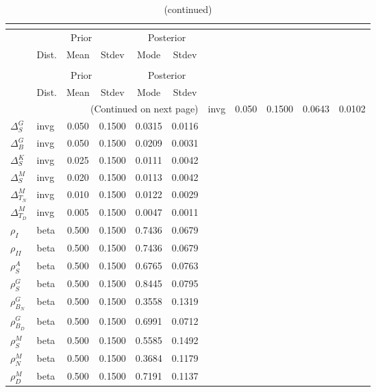  
\begin{center}
\begin{longtable}{llcccc} 
\caption{Results from posterior maximization (parameters)}\\
 \label{Table:Posterior:1}\\
\toprule 
  & \multicolumn{3}{c}{Prior}  &  \multicolumn{2}{c}{Posterior} \\
  \cmidrule(r{.75em}){2-4} \cmidrule(r{.75em}){5-6}
  & Dist. & Mean  & Stdev & Mode & Stdev \\ 
\midrule \endfirsthead 
\caption{(continued)}\\
 \bottomrule 
  & \multicolumn{3}{c}{Prior}  &  \multicolumn{2}{c}{Posterior} \\
  \cmidrule(r{.75em}){2-4} \cmidrule(r{.75em}){5-6}
  & Dist. & Mean  & Stdev & Mode & Stdev \\ 
\midrule \endhead 
\bottomrule \multicolumn{6}{r}{(Continued on next page)}\endfoot 
\bottomrule\endlastfoot 
${\Delta^{A}_{S}}$ & invg &   0.050 & 0.1500 &   0.0643 &  0.0102 \\ 
${\Delta^{G}_{S}}$ & invg &   0.050 & 0.1500 &   0.0315 &  0.0116 \\ 
${\Delta^{G}_{B}}$ & invg &   0.050 & 0.1500 &   0.0209 &  0.0031 \\ 
${\Delta^{K}_{S}}$ & invg &   0.025 & 0.1500 &   0.0111 &  0.0042 \\ 
${\Delta^{M}_{S}}$ & invg &   0.020 & 0.1500 &   0.0113 &  0.0042 \\ 
${\Delta^{M}_{T_N}}$ & invg &   0.010 & 0.1500 &   0.0122 &  0.0029 \\ 
${\Delta^{M}_{T_D}}$ & invg &   0.005 & 0.1500 &   0.0047 &  0.0011 \\ 
${\rho_{I}}$ & beta &   0.500 & 0.1500 &   0.7436 &  0.0679 \\ 
${\rho_{II}}$ & beta &   0.500 & 0.1500 &   0.7436 &  0.0679 \\ 
${\rho^{A}_{S}}$ & beta &   0.500 & 0.1500 &   0.6765 &  0.0763 \\ 
${\rho^{G}_{S}}$ & beta &   0.500 & 0.1500 &   0.8445 &  0.0795 \\ 
${\rho^{G}_{B_N}}$ & beta &   0.500 & 0.1500 &   0.3558 &  0.1319 \\ 
${\rho^{G}_{B_D}}$ & beta &   0.500 & 0.1500 &   0.6991 &  0.0712 \\ 
${\rho^{M}_{S}}$ & beta &   0.500 & 0.1500 &   0.5585 &  0.1492 \\ 
${\rho^{M}_{N}}$ & beta &   0.500 & 0.1500 &   0.3684 &  0.1179 \\ 
${\rho^{M}_{D}}$ & beta &   0.500 & 0.1500 &   0.7191 &  0.1137 \\ 
\end{longtable}
 \end{center}
